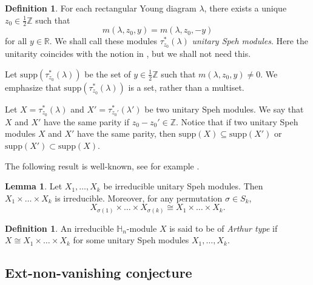 \documentclass[11pt]{amsart}
\numberwithin{equation}{section}
\theoremstyle{definition}
\newtheorem{lemma}[thm]{Lemma}
\newtheorem{definition}[thm]{Definition}
\begin{document}
\begin{definition}
For each rectangular Young diagram $\lambda$, there exists a unique $z_0 \in \frac{1}{2}\mathbb Z$ such that 
\[ m(\lambda, z_0, y)=m(\lambda, z_0, -y) \]
for all $y \in \mathbb R$. We shall call these modules $\tau_{z_{0}}^{*}(\lambda)$  \emph{unitary Speh modules}. Here the unitarity coincides with the notion in \cite{barbasch2014unitary}, but we shall not need this.

Let $\mathrm{supp}(\tau^*_{z_0}(\lambda))$ be the set of $y \in \frac{1}{2}\mathbb Z$ such that $m(\lambda, z_0, y)\neq 0$. We emphasize that \(\mathrm{supp}(\tau^*_{z_0}(\lambda))\) is a set, rather than a multiset. 

Let \(X=\tau^*_{z_0}(\lambda)\) and \(X'=\tau^*_{z_0'}(\lambda')\) be two unitary Speh modules. We say that \(X\) and \(X'\) have the same parity if \(z_0-z_0'\in \mathbb Z\). Notice that if two unitary Speh modules \(X\) and \(X'\) have the same parity, then \(\mathrm{supp}(X)\subseteq \mathrm{supp}(X')\) or \(\mathrm{supp}(X')\subset \mathrm{supp}(X)\).


\end{definition}






The following result is well-known, see for example \cite[Theorem 7.1]{tadic}.
\begin{lemma} \label{lem prop speh modules}
Let $X_1,\ldots, X_k$ be irreducible unitary Speh modules. Then $X_1\times \ldots \times X_k$ is irreducible. Moreover, for any permutation $\sigma \in S_k$,
\[   X_{\sigma(1)} \times \ldots \times X_{\sigma(k)} \cong X_1 \times \ldots \times X_k .
\]
\end{lemma}


\begin{definition}
An irreducible $\mathbb H_n$-module $X$ is said to be of \emph{Arthur type} if $X\cong X_1\times \ldots \times X_k$ for some unitary Speh modules $X_1, \ldots, X_k$.
\end{definition}



\subsection{Ext-non-vanishing conjecture}
\end{document}

